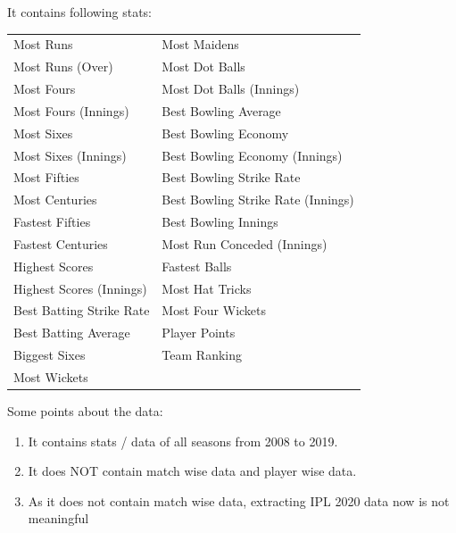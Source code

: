 \documentclass[12pt]{article}
\begin{document}
	It contains following stats:\\
	\begingroup
	\setlength{\tabcolsep}{15pt} %
	\renewcommand{\arraystretch}{1.3} %
	\begin{tabular}{ l l}
		\textbullet Most Runs & \textbullet Most Maidens \\
		\textbullet Most Runs (Over) & \textbullet Most Dot Balls \\
		\textbullet Most Fours & \textbullet Most Dot Balls (Innings) \\
		\textbullet Most Fours (Innings) & \textbullet Best Bowling Average \\
		\textbullet Most Sixes & \textbullet Best Bowling Economy \\
		\textbullet Most Sixes (Innings) & \textbullet Best Bowling Economy (Innings) \\
		\textbullet Most Fifties & \textbullet Best Bowling Strike Rate \\
		\textbullet Most Centuries & \textbullet Best Bowling Strike Rate (Innings) \\
		\textbullet Fastest Fifties & \textbullet Best Bowling Innings \\
		\textbullet Fastest Centuries & \textbullet Most Run Conceded (Innings) \\
		\textbullet Highest Scores & \textbullet Fastest Balls \\
		\textbullet Highest Scores (Innings) & \textbullet Most Hat Tricks \\
		\textbullet Best Batting Strike Rate & \textbullet Most Four Wickets \\
		\textbullet Best Batting Average & \textbullet Player Points \\
		\textbullet Biggest Sixes & \textbullet Team Ranking \\
		\textbullet Most Wickets &  \\
	\end{tabular}
	\newline\newline\newline
	Some points about the data:
	\begin{enumerate}
		\itemsep -0.2em 
		\item It contains stats / data of all seasons from 2008 to 2019.
		\item It does NOT contain match wise data and player wise data.
		\item As it does not contain match wise data, extracting IPL 2020 data now is not meaningful
	\end{enumerate}
	
\end{document}

